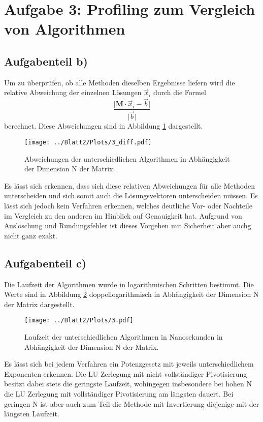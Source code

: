 \section*{Aufgabe 3: Profiling zum Vergleich von Algorithmen}


\subsection*{Aufgabenteil b)}
Um zu überprüfen, ob alle Methoden dieselben Ergebnisse liefern wird die relative Abweichung der einzelnen Lösungen $\vec{x}_i$ durch die Formel
\begin{equation}
  \frac{\lvert \symbf{M}\cdot \vec{x}_i-\vec{b} \rvert}{\lvert \vec{b} \rvert}
\end{equation}
berechnet. Diese Abweichungen sind in Abbildung \ref{fig:abw} dargestellt.
\begin{figure}[H]
  \centering
  \texttt{[image: ../Blatt2/Plots/3\_diff.pdf]}
  \caption{Abweichungen der unterschiedlichen Algorithmen in Abhängigkeit der Dimension N der Matrix.}
  \label{fig:abw}
\end{figure}
Es lässt sich erkennen, dass sich diese relativen Abweichungen für alle Methoden unterscheiden und sich somit auch die Lösungsvektoren unterscheiden müssen. Es lässt sich jedoch kein Verfahren erkennen, welches
deutliche Vor- oder Nachteile im Vergleich zu den anderen im Hinblick auf Genauigkeit hat. Aufgrund von Auslöschung und Rundungsfehler ist dieses Vorgehen mit Sicherheit aber auchg nicht ganz exakt.


\subsection*{Aufgabenteil c)}
Die Laufzeit der Algorithmen wurde in logarithmischen Schritten bestimmt. Die Werte sind in Abbildung \ref{fig:laufzeit} doppellogarithmisch in Abhängigkeit der Dimension N der Matrix dargestellt.
\begin{figure}[H]
  \centering
  \texttt{[image: ../Blatt2/Plots/3.pdf]}
  \caption{Laufzeit der unterschiedlichen Algorithmen in Nanosekunden in Abhängigkeit der Dimension N der Matrix.}
  \label{fig:laufzeit}
\end{figure}
Es lässt sich bei jedem Verfahren ein Potenzgesetz mit jeweils unterschiedlichem Exponenten erkennen.
Die LU Zerlegung mit nicht vollständiger Pivotisierung besitzt dabei stets die geringste Laufzeit, wohingegen insbesondere bei hohen N die LU Zerlegung mit vollständiger Pivotisierung am längsten dauert. Bei geringen N ist aber auch zum Teil die Methode mit Invertierung diejenige mit der längsten Laufzeit.

